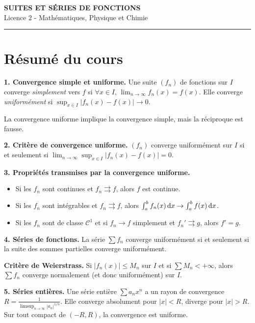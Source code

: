 \documentclass[12pt,a4paper]{article}
\begin{document}
\fi

\begin{center}
  {\LARGE\bfseries SUITES ET SÉRIES DE FONCTIONS}\\[0.3cm]
  {\normalsize Licence 2 - Mathématiques, Physique et Chimie}\\[0.1cm]
  \rule{0.7\textwidth}{0.8pt}
\end{center}

\section*{Résumé du cours}

\begin{boiteresume}

\textbf{1. Convergence simple et uniforme.} Une suite $(f_n)$ de fonctions sur $I$ converge \textit{simplement} vers $f$ si $\forall x\in I$, $\lim_{n\to\infty}f_n(x)=f(x)$. Elle converge \textit{uniformément} si $\sup_{x\in I}|f_n(x)-f(x)|\to0$.

La convergence uniforme implique la convergence simple, mais la réciproque est fausse.

\textbf{2. Critère de convergence uniforme.} $(f_n)$ converge uniformément sur $I$ si et seulement si $\lim_{n\to\infty}\sup_{x\in I}|f_n(x)-f(x)|=0$.

\textbf{3. Propriétés transmises par la convergence uniforme.}
\begin{itemize}[nosep]
  \item Si les $f_n$ sont continues et $f_n\rightrightarrows f$, alors $f$ est continue.
  \item Si les $f_n$ sont intégrables et $f_n\rightrightarrows f$, alors $\int_a^b f_n(x)\,\mathrm{d} x\to\int_a^b f(x)\,\mathrm{d} x$.
  \item Si les $f_n$ sont de classe $\mathcal{C}^1$ et si $f_n\to f$ simplement et $f_n'\rightrightarrows g$, alors $f'=g$.
\end{itemize}

\textbf{4. Séries de fonctions.} La série $\sum f_n$ converge uniformément si et seulement si la suite des sommes partielles converge uniformément.

\textbf{Critère de Weierstrass.} Si $|f_n(x)|\leq M_n$ sur $I$ et si $\sum M_n<+\infty$, alors $\sum f_n$ converge normalement (et donc uniformément) sur $I$.

\textbf{5. Séries entières.} Une série entière $\sum a_n x^n$ a un rayon de convergence $R = \frac{1}{\limsup_{n\to\infty}|a_n|^{1/n}}$. Elle converge absolument pour $|x|<R$, diverge pour $|x|>R$. Sur tout compact de $(-R,R)$, la convergence est uniforme.

\end{boiteresume}
\end{document}
